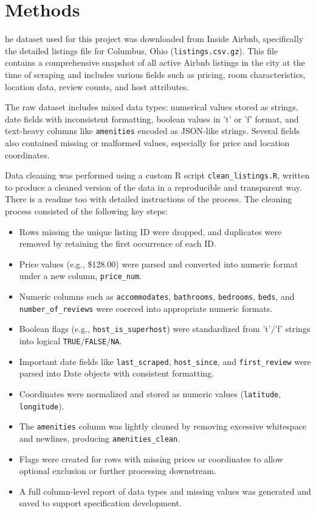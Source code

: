 \documentclass[9pt,a4paper,onecolumn,twoside]{tau-class/tau}
\begin{document}
\section{Methods}

he dataset used for this project was downloaded from Inside Airbnb, specifically the detailed listings file for Columbus, Ohio (\texttt{listings.csv.gz}). This file contains a comprehensive snapshot of all active Airbnb listings in the city at the time of scraping and includes various fields such as pricing, room characteristics, location data, review counts, and host attributes.

The raw dataset includes mixed data types: numerical values stored as strings, date fields with inconsistent formatting, boolean values in 't' or 'f' format, and text-heavy columns like \texttt{amenities} encoded as JSON-like strings. Several fields also contained missing or malformed values, especially for price and location coordinates.

Data cleaning was performed using a custom R script \texttt{clean\_listings.R}, written to produce a cleaned version of the data in a reproducible and transparent way. There is a readme too with detailed instructions of the process. The cleaning process consisted of the following key steps:

\begin{itemize}
    \item Rows missing the unique listing ID were dropped, and duplicates were removed by retaining the first occurrence of each ID.
    \item Price values (e.g., \$128.00) were parsed and converted into numeric format under a new column, \texttt{price\_num}.
    \item Numeric columns such as \texttt{accommodates}, \texttt{bathrooms}, \texttt{bedrooms}, \texttt{beds}, and \texttt{number\_of\_reviews} were coerced into appropriate numeric formats.
    \item Boolean flags (e.g., \texttt{host\_is\_superhost}) were standardized from 't'/'f' strings into logical \texttt{TRUE}/\texttt{FALSE}/\texttt{NA}.
    \item Important date fields like \texttt{last\_scraped}, \texttt{host\_since}, and \texttt{first\_review} were parsed into Date objects with consistent formatting.
    \item Coordinates were normalized and stored as numeric values (\texttt{latitude}, \texttt{longitude}).
    \item The \texttt{amenities} column was lightly cleaned by removing excessive whitespace and newlines, producing \texttt{amenities\_clean}.
    \item Flags were created for rows with missing prices or coordinates to allow optional exclusion or further processing downstream.
    \item A full column-level report of data types and missing values was generated and saved to support  specification development.
\end{itemize}
\end{document}
